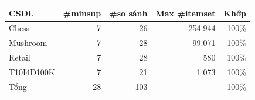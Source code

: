 \begin{tabular}{@{}lrrrr@{}}
\toprule
CSDL & \#minsup & \#so sánh & Max \#itemset & Khớp \\
\midrule
Chess & 7 & 26 & 254{.}944 & 100\% \\
Mushroom & 7 & 28 & 99{.}071 & 100\% \\
Retail & 7 & 28 & 580 & 100\% \\
T10I4D100K & 7 & 21 & 1{.}073 & 100\% \\
\midrule
Tổng & 28 & 103 & & 100\% \\
\bottomrule
\end{tabular}